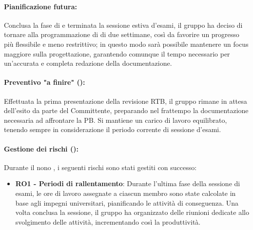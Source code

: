 \paragraph*{Pianificazione futura:}
\par Conclusa la fase di \RTB e terminata la sessione estiva d'esami, il gruppo ha deciso di tornare alla programmazione di  di due settimane, così da favorire un progresso più flessibile e meno restrittivo; in questo modo sarà possibile mantenere un focus maggiore sulla progettazione, garantendo comunque il tempo necessario per un'accurata e completa redazione della documentazione.

\paragraph*{Preventivo "a finire" ():}
\par Effettuata la prima presentazione della revisione RTB, il gruppo rimane in attesa dell'esito da parte del Committente, preparando nel frattempo la documentazione necessaria ad affrontare la PB. Si mantiene un carico di lavoro equilibrato, tenendo sempre in considerazione il periodo corrente di sessione d'esami.

\paragraph*{Gestione dei rischi ():}
\par Durante il nono , i seguenti rischi sono stati gestiti con successo:
\begin{itemize}
  \item \textbf{RO1 - Periodi di rallentamento}: Durante l'ultima fase della sessione di esami, le ore di lavoro assegnate a ciascun membro sono state calcolate in base agli impegni universitari, pianificando le attività di conseguenza. Una volta conclusa la sessione, il gruppo ha organizzato delle riunioni dedicate allo svolgimento delle attività, incrementando così la produttività.
\end{itemize}
